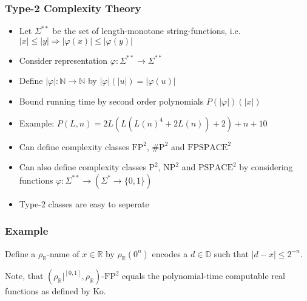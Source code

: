 \documentclass[xcolor=pdftex,dvipsnames,table]{beamer}
\newcommand{\N}{\ensuremath{\mathbb{N}}}
\newcommand{\R}{\ensuremath{\mathbb{R}}}
\newcommand{\RR}{\ensuremath{\mathbb{R}}}
\newcommand{\D}{\ensuremath{\mathbb{D}}}
\newcommand{\sigmas}{\ensuremath{\Sigma^{**}}}
\newcommand{\abs}[1]{\left|#1\right|}
\newcommand{\fpt}{\ensuremath{\text{FP}^2}\xspace}
\newcommand{\fpspacet}{\ensuremath{\text{FPSPACE}^2}\xspace}
\newcommand{\sharpt}{\ensuremath{\text{\#P}^2}\xspace}
\newcommand{\pt}{\ensuremath{\text{P}^2}\xspace}
\newcommand{\npt}{\ensuremath{\text{NP}^2}\xspace}
\newcommand{\pspacet}{\ensuremath{\text{PSPACE}^2}\xspace}
\begin{document}
\begin{frame}
  \frametitle{Type-2 Complexity Theory}
  \begin{itemize}
  \item Let $\sigmas$ be the set of length-monotone string-functions, i.e. $\abs{x} \leq \abs{y} \Rightarrow \abs{\varphi(x)} \leq \abs{\varphi(y)}$
  \item Consider representation $\varphi : \sigmas \to \sigmas$
  \item Define $\abs{\varphi} : \N \to \N$ by $\abs{\varphi}(\abs{u}) = \abs{\varphi(u)}$
   \item Bound running time by second order polynomials $P(\abs{\varphi})(\abs{x})$
   \item Example: $P(L,n) = 2L(L(L(n)^4+2L(n))+2)+n+10$
   \item  Can define complexity classes \fpt, \sharpt and \fpspacet 
   \item  Can also define complexity classes \pt, \npt and \pspacet by considering functions $\varphi : \sigmas \to (\Sigma^* \to \{0,1\})$
     \item Type-2 classes are easy to seperate
  
  \end{itemize}
\end{frame}
\begin{frame}
  \frametitle{Example}
  Define a $\rho_\R$-name of $x \in \RR$ by
  $\rho_\R(0^n)$ encodes a $d \in \D$ such that $\abs{d-x} \leq 2^{-n} $.
		\begin{figure}
		\centering
    \vfill
		\end{figure}

  Note, that $(\rho_\R|^{[0,1]}, \rho_\R)$-\fpt equals the polynomial-time computable real functions as defined by Ko.
\end{frame}
\end{document}
